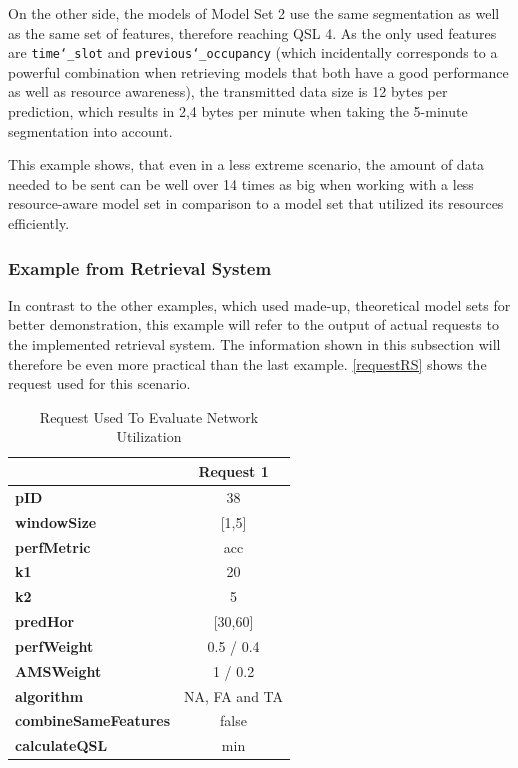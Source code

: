 On the other side, the models of Model Set 2 use the same segmentation as well as the same set of features, therefore reaching QSL 4. As the only used features are \texttt{time\char`_slot} and \texttt{previous\char`_occupancy} (which incidentally corresponds to a powerful combination when retrieving models that both have a good performance as well as resource awareness), the transmitted data size is 12 bytes per prediction, which results in 2,4 bytes per minute when taking the 5-minute segmentation into account.

This example shows, that even in a less extreme scenario, the amount of data needed to be sent can be well over 14 times as big when working with a less resource-aware model set in comparison to a model set that utilized its resources efficiently.

\subsubsection{Example from Retrieval System}

In contrast to the other examples, which used made-up, theoretical model sets for better demonstration, this example will refer to the output of actual requests to the implemented retrieval system. The information shown in this subsection will therefore be even more practical than the last example. \autoref{requestRS} shows the request used for this scenario.

\begin{table}[htb]
  \centering
      \begin{tabular}{ l | c}
          \toprule
          &
  \textbf{Request 1}      
   \\\midrule
  
  \textbf{pID} & 38 \\\midrule
  \textbf{windowSize} & [1,5] \\\midrule
  \textbf{perfMetric} & acc  \\\midrule
  \textbf{k1} & 20\\\midrule
  \textbf{k2} & 5 \\\midrule
  \textbf{predHor} & [30,60]\\\midrule
  \textbf{perfWeight} & 0.5 / 0.4 \\\midrule
  \textbf{AMSWeight} & 1 / 0.2\\\midrule
  \textbf{algorithm}  & NA, FA and TA  \\\midrule
  \textbf{combineSameFeatures} & false \\\midrule
  \textbf{calculateQSL} & min \\
          \bottomrule
      \end{tabular}
  \caption{Request Used To Evaluate Network Utilization} \label{requestRS}
  \end{table}


